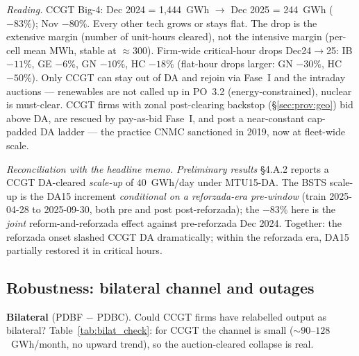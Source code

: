 \documentclass[11pt,a4paper]{article}
\begin{document}
\begin{table}[H]
\centering
\caption{\textbf{Same-calendar-month auction-cleared DA volume by technology, GWh} (PDBC, pivotal-firm aggregate). Bilaterals excluded. Each column pair compares the same calendar month one year apart, so seasonality cancels. Only CCGT collapses; every other tech grows or stays flat.}
\label{tab:q1_drop_by_tech}

\end{table}

\textit{Reading.} CCGT Big-4: Dec 2024 = 1{,}444~GWh $\to$ Dec 2025 = 244~GWh (\textbf{$-83\%$}); Nov $-80\%$. Every other tech grows or stays flat. The drop is the extensive margin (number of unit-hours cleared), not the intensive margin (per-cell mean MWh, stable at $\approx\!300$). Firm-wide critical-hour drops Dec24$\to$25: IB $-11\%$, GE $-6\%$, GN $-10\%$, HC $-18\%$ (flat-hour drops larger: GN $-30\%$, HC $-50\%$). Only CCGT can stay out of DA and rejoin via Fase~I and the intraday auctions --- renewables are not called up in PO~3.2 (energy-constrained), nuclear is must-clear. CCGT firms with zonal post-clearing backstop (\S\ref{sec:prov:geo}) bid above DA, are rescued by pay-as-bid Fase~I, and post a near-constant cap-padded DA ladder --- the practice CNMC sanctioned in 2019, now at fleet-wide scale.

\textit{Reconciliation with the headline memo.} \emph{Preliminary results} \S 4.A.2 reports a CCGT DA-cleared \emph{scale-up} of $40$~GWh/day under MTU15-DA. The BSTS scale-up is the DA15 increment \emph{conditional on a reforzada-era pre-window} (train 2025-04-28 to 2025-09-30, both pre and post post-reforzada); the $-83\%$ here is the \emph{joint} reform-and-reforzada effect against pre-reforzada Dec 2024. Together: the reforzada onset slashed CCGT DA dramatically; within the reforzada era, DA15 partially restored it in critical hours.

\subsection{Robustness: bilateral channel and outages}\label{sec:prov:q1_drop:bilat}

\noindent \textbf{Bilateral} (PDBF $-$ PDBC). Could CCGT firms have relabelled output as bilateral? Table~\ref{tab:bilat_check}: for CCGT the channel is small ($\sim\!90$--$128$~GWh/month, no upward trend), so the auction-cleared collapse is real.

\begin{table}[H]
\centering
\caption{\textbf{Bilateral channel by technology and regime, GWh / month} (PDBF $-$ PDBC, pivotal-firm aggregate). CCGT bilaterals are small and stable; Hydro / Nuclear / Wind bilaterals are an order of magnitude larger and structurally part of their dispatch.}
\label{tab:bilat_check}
\setlength{\tabcolsep}{4pt}

\end{table}
\end{document}
